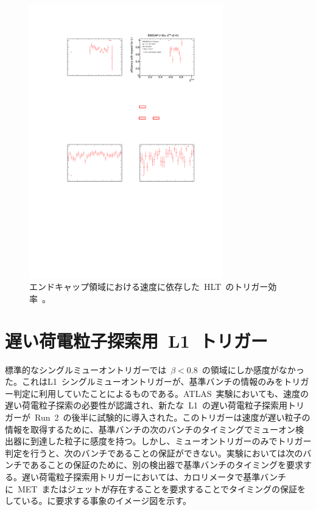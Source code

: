 \begin{figure}[H]
        \centering   
        \includegraphics[width=0.75\textwidth,page=1]{img/pdf3/hlt.pdf}
        \caption[エンドキャップ領域における速度に依存した HLT のトリガー効率]{エンドキャップ領域における速度に依存した~HLT~のトリガー効率~\cite{MT:01}。}
        \label{fig:hlt}
\end{figure}

\section{遅い荷電粒子探索用~L1~トリガー}
\label{sec:latemu}
標準的なシングルミューオントリガーでは~$\beta<0.8$~の領域にしか感度がなかった。これはL1~シングルミューオントリガーが、基準バンチの情報のみをトリガー判定に利用していたことによるものである。ATLAS~実験においても、速度の遅い荷電粒子探索の必要性が認識され、新たな~L1~の遅い荷電粒子探索用トリガーが~Run~2~の後半に試験的に導入された。このトリガーは速度が遅い粒子の情報を取得するために、基準バンチの次のバンチのタイミングでミューオン検出器に到達した粒子に感度を持つ。しかし、ミューオントリガーのみでトリガー判定を行うと、次のバンチであることの保証ができない。実験においては次のバンチであることの保証のために、別の検出器で基準バンチのタイミングを要求する。遅い荷電粒子探索用トリガーにおいては、カロリメータで基準バンチに~MET~またはジェットが存在することを要求することでタイミングの保証をしている。に要求する事象のイメージ図を示す。

